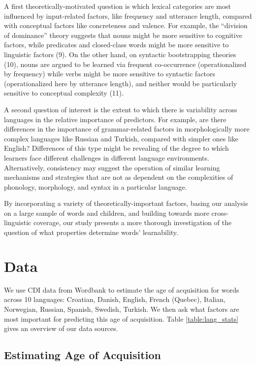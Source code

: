 \documentclass[9pt,twocolumn,twoside]{pnas-new}
\begin{document}
A first theoretically-motivated question is which lexical categories are
most influenced by input-related factors, like frequency and utterance
length, compared with conceptual factors like concreteness and valence.
For example, the ``division of dominance'' theory suggests that nouns
might be more sensitive to cognitive factors, while predicates and
closed-class words might be more sensitive to linguistic factors (9). On
the other hand, on syntactic bootstrapping theories (10), nouns are
argued to be learned via frequent co-occurrence (operationalized by
frequency) while verbs might be more sensitive to syntactic factors
(operationalized here by utterance length), and neither would be
particularly sensitive to conceptual complexity (11).

A second question of interest is the extent to which there is
variability across languages in the relative importance of predictors.
For example, are there differences in the importance of grammar-related
factors in morphologically more complex languages like Russian and
Turkish, compared with simpler ones like English? Differences of this
type might be revealing of the degree to which learners face different
challenges in different language environments. Alternatively,
consistency may suggest the operation of similar learning mechanisms and
strategies that are not as dependent on the complexities of phonology,
morphology, and syntax in a particular language.

By incorporating a variety of theoretically-important factors, basing
our analysis on a large sample of words and children, and building
towards more cross-linguistic coverage, our study presents a more
thorough investigation of the question of what properties determine
words' learnability.

\section*{Data}\label{data}

We use CDI data from Wordbank to estimate the age of acquisition for
words across 10 languages: Croatian, Danish, English, French (Quebec),
Italian, Norwegian, Russian, Spanish, Swedish, Turkish. We then ask what
factors are most important for predicting this age of acquisition. Table
\ref{table:lang_stats} gives an overview of our data sources.

\subsection{Estimating Age of
Acquisition}\label{estimating-age-of-acquisition}
\end{document}
